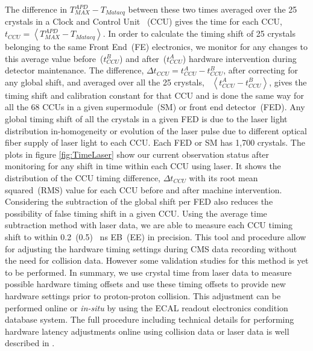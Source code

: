 The difference in $ T^{APD}_{MAX} - T_{Matacq} $ between these two times averaged over the  25 crystals in a Clock and Control Unit ~(CCU) gives the time for each CCU, $ t_{CCU} = \left\langle T^{APD}_{MAX} - T_{Matacq} \right\rangle $. In order to calculate the timing shift of 25 crystals belonging to the same Front End~(FE) electronics, we monitor for any changes to this average value before~($t^{B}_{CCU} $) and after~($t^{A}_{CCU} $) hardware intervention during detector maintenance.  The difference, $\Delta t_{CCU} = t^{A}_{CCU} - t^{B}_{CCU}$, after correcting for any global shift, and averaged over all the 25 crystals, \ie ~$\left\langle t^{A}_{CCU} - t^{B}_{CCU} \right\rangle $, gives the timing shift and calibration constant for that CCU and is done the same way for all the 68 CCUs in a given supermodule~(SM) or front end detector~(FED). Any global timing shift of all the crystals in a given FED is due to the laser light distribution in-homogeneity or evolution of the laser pulse due to different optical fiber supply of laser light to each CCU. Each FED or SM has 1,700 \pb crystals. 
The plots in figure \ref{fig:TimeLaser} show our current observation status after monitoring for any shift in time within each CCU using laser. It shows the distribution of the CCU timing difference, $\Delta t_{CCU}$ with its root mean squared~(RMS) value for each CCU before and after machine intervention. Considering the subtraction of the global shift per FED also reduces the possibility of false timing shift in a given CCU.
Using the average time subtraction method with laser data, we are able to measure each CCU timing shift to within 0.2~(0.5)~ ns EB~(EE) in precision. This tool and procedure allow for adjusting the hardware timing settings during CMS data  recording without the need for collision data. However some validation studies for this method is yet to be performed.  
In summary, we use crystal time from laser data to measure possible hardware timing offsets and use these timing offsets to provide new hardware settings prior to proton-proton collision. This adjustment can be performed online or \textit{in-situ} by using the ECAL readout electronics condition database system. The full procedure including technical details for performing hardware latency adjustments online using collision data or laser data is well described in \cite{ECALHW}.
\clearpage
